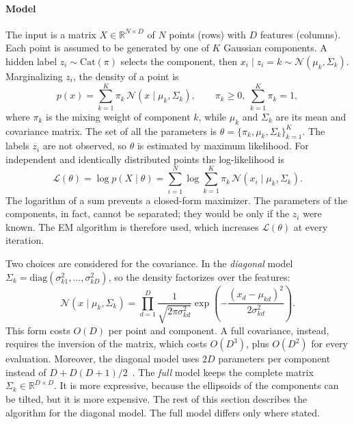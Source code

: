 \documentclass[conference,onecolumn]{IEEEtran}
\begin{document}
\paragraph{Model} The input is a matrix $X \in \mathbb{R}^{N\times D}$ of $N$ points (rows) with $D$ features (columns). Each point is assumed to be generated by one of $K$ Gaussian components. A hidden label $z_i \sim \mathrm{Cat}(\pi)$ selects the component, then $x_i \mid z_i{=}k \sim \mathcal{N}(\mu_k,\Sigma_k)$. Marginalizing $z_i$, the density of a point is
\begin{equation}
  p(x) = \sum_{k=1}^{K} \pi_k \, \mathcal{N}(x \mid \mu_k, \Sigma_k),
  \qquad \pi_k \ge 0,\ \sum_{k=1}^{K} \pi_k = 1,
\end{equation}
where $\pi_k$ is the mixing weight of component $k$, while $\mu_k$ and $\Sigma_k$ are its mean and covariance matrix. The set of all the parameters is $\theta=\{\pi_k,\mu_k,\Sigma_k\}_{k=1}^{K}$. The labels $z_i$ are not observed, so $\theta$ is estimated by maximum likelihood. For independent and identically distributed points the log-likelihood is
\begin{equation}
  \mathcal{L}(\theta) = \log p(X \mid \theta) = \sum_{i=1}^{N} \log \sum_{k=1}^{K} \pi_k \, \mathcal{N}(x_i \mid \mu_k,\Sigma_k).
\end{equation}
The logarithm of a sum prevents a closed-form maximizer. The parameters of the components, in fact, cannot be separated; they would be only if the $z_i$ were known. The EM algorithm is therefore used, which increases $\mathcal{L}(\theta)$ at every iteration.

Two choices are considered for the covariance. In the \emph{diagonal} model $\Sigma_k=\mathrm{diag}(\sigma_{k1}^2,\dots,\sigma_{kD}^2)$, so the density factorizes over the features:
\begin{equation}
  \mathcal{N}(x \mid \mu_k,\Sigma_k) = \prod_{d=1}^{D} \frac{1}{\sqrt{2\pi\sigma_{kd}^2}} \exp\!\left(-\frac{(x_d-\mu_{kd})^2}{2\sigma_{kd}^2}\right).
\end{equation}
This form costs $O(D)$ per point and component. A full covariance, instead, requires the inversion of the matrix, which costs $O(D^3)$, plus $O(D^2)$ for every evaluation. Moreover, the diagonal model uses $2D$ parameters per component instead of $D+D(D+1)/2$~\cite[Sec.~4]{sanderson}. The \emph{full} model keeps the complete matrix $\Sigma_k\in\mathbb{R}^{D\times D}$. It is more expressive, because the ellipsoids of the components can be tilted, but it is more expensive. The rest of this section describes the algorithm for the diagonal model. The full model differs only where stated.
\end{document}
